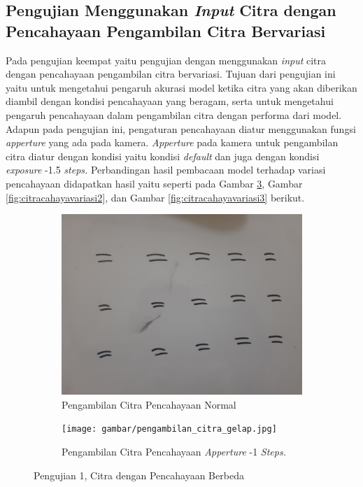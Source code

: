 \subsection{Pengujian Menggunakan \textit{Input} Citra dengan Pencahayaan Pengambilan Citra Bervariasi}
\label{subsec:pengujiancitrabedaintensitas}

Pada pengujian keempat yaitu pengujian dengan menggunakan \textit{input} citra dengan pencahayaan pengambilan citra bervariasi. Tujuan dari pengujian ini yaitu untuk mengetahui pengaruh akurasi model ketika citra yang akan diberikan diambil dengan kondisi pencahayaan yang beragam, serta untuk mengetahui pengaruh pencahayaan dalam pengambilan citra dengan performa dari model. Adapun pada pengujian ini, pengaturan pencahayaan diatur menggunakan fungsi \textit{apperture} yang ada pada kamera. \textit{Apperture} pada kamera untuk pengambilan citra diatur dengan kondisi yaitu kondisi \textit{default} dan juga dengan kondisi \textit{exposure} -1.5 \textit{steps.} Perbandingan hasil pembacaan model terhadap variasi pencahayaan didapatkan hasil yaitu seperti pada Gambar \ref*{fig:citracahayavariasi1}, Gambar \ref*{fig:citracahayavariasi2}, dan Gambar \ref*{fig:citracahayavariasi3} berikut.

\begin{figure}[H]
  \begin{subfigure}{.5\textwidth}
    \centering
    \captionsetup{width=.8\linewidth}
    \includegraphics[width=.85\linewidth]{gambar/pengambilan_citra_terang.jpg}
    \caption{Pengambilan Citra Pencahayaan Normal}
    \label{fig:1citracahaya0}
  \end{subfigure}%
  \begin{subfigure}{.5\textwidth}
    \centering
    \captionsetup{width=.8\linewidth}
    \texttt{[image: gambar/pengambilan\_citra\_gelap.jpg]}
    \caption{Pengambilan Citra Pencahayaan \textit{Apperture} -1 \textit{Steps.}}
    \label{fig:1citracahayamin10}
  \end{subfigure}
  \caption{Pengujian 1, Citra dengan Pencahayaan Berbeda}
  \label{fig:citracahayavariasi1}
\end{figure}

